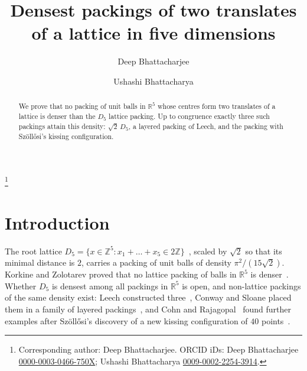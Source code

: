 \documentclass[11pt]{amsart}
\theoremstyle{definition}
\theoremstyle{remark}
\numberwithin{equation}{section}
\numberwithin{table}{section}
\numberwithin{figure}{section}
\newcommand{\R}{\mathbb{R}}
\newcommand{\Z}{\mathbb{Z}}
\begin{document}
\title[Packings of two lattice translates in five dimensions]{Densest packings of two translates\\ of a lattice in five dimensions}

\author{Deep Bhattacharjee}
\address{Formerly, Electro-Gravitational Space Propulsion Laboratory (EGSPL),\newline Bhubaneswar, Odisha 751030, India}
\author{Ushashi Bhattacharya}
\address{Formerly, National Taiwan University, Taipei 106319, Taiwan}
\thanks{Corresponding author: Deep Bhattacharjee. ORCID iDs: Deep Bhattacharjee \href{https://orcid.org/0000-0003-0466-750X}{\mbox{0000-0003-0466-750X}}; Ushashi Bhattacharya \href{https://orcid.org/0009-0002-2254-3914}{\mbox{0009-0002-2254-3914}}.}


\begin{abstract}
We prove that no packing of unit balls in $\R^5$ whose centres form two translates of a lattice is denser than the $D_5$ lattice packing. Up to congruence exactly three such packings attain this density: $\sqrt2\,D_5$, a layered packing of Leech, and the packing with Szöllősi's kissing configuration.
\end{abstract}

\maketitle

\section{Introduction}

The root lattice $D_5=\{x\in\Z^5:x_1+\dots+x_5\in2\Z\}$~\cite[Ch.~4, \S7.1]{CS1999}, scaled by $\sqrt2$ so that its minimal distance is $2$, carries a packing of unit balls of density $\pi^2/(15\sqrt2)$. Korkine and Zolotarev proved that no lattice packing of balls in $\R^5$ is denser~\cite{KZ1877}. Whether $D_5$ is densest among all packings in $\R^5$ is open, and non-lattice packings of the same density exist: Leech constructed three~\cite{Leech1967}, Conway and Sloane placed them in a family of layered packings~\cite{CS1995}, and Cohn and Rajagopal~\cite{CR2026} found further examples after Szöllősi's discovery of a new kissing configuration of $40$ points~\cite{Szollosi2023}.
\end{document}
